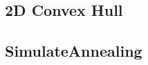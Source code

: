 \documentclass[a4paper,10pt,twocolumn,oneside]{article}
\begin{document}
%

%

\subsection{2D Convex Hull}


\subsection{SimulateAnnealing}


%

%

%

%

%
\end{document}
